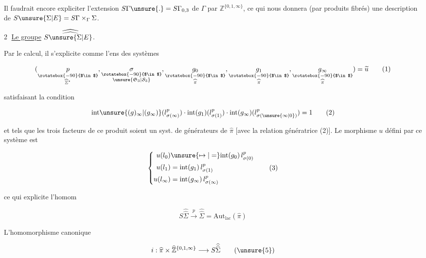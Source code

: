 Il faudrait encore expliciter l'extension $S\Gamma\unsure{.}=S\Gamma_{0,3}$ de $\Gamma$ par $\mathbb Z^{\{0,1,\infty\}}$, ce qui nous donnera (par produits fibrés) une description de $S\unsure{\Sigma|E}=S\Gamma\times_\Gamma\Sigma$.

\textcircled{2} \uline{Le groupe} $S\widehat{\widehat{\unsure{\Sigma|E}}}$.

Par le calcul, il s'explicite comme l'ens des systèmes

\[
(\underset{\substack{\rotatebox{-90}{$\in$}\\\widehat{\mathbb Z}^{*}}}{p},
 \underset{\substack{\rotatebox{-90}{$\in$}\\\unsure{\mathfrak S_3|\mathcal S_3}}}{\sigma},
 \underset{\substack{\rotatebox{-90}{$\in$}\\\widehat\pi}}{g_0},
 \underset{\substack{\rotatebox{-90}{$\in$}\\\widehat\pi}}{g_1},
 \underset{\substack{\rotatebox{-90}{$\in$}\\\widehat\pi}}{g_\infty})=\widetilde u \tag*{(1)}
\]

satisfaisant la condition

\[
\mathrm{int}\unsure{(g)_{\infty}|(g_{\infty})}(l_{\sigma(\infty)}^p)\cdot
\mathrm{int}(g_1)(l_{\sigma(1)}^p)\cdot
\mathrm{int}(g_\infty)(l_{\sigma(\unsure{\infty|0})}^p)=1 \tag*{(2)}
\]

et tels que les trois facteurs de ce produit soient un syst. de générateurs de $\widehat\pi$ [avec la relation génératrice (2)]. Le morphisme $u$ défini par ce  système est

\[
\left\{\begin{aligned}
u(l_0)&\unsure{\mapsto|=}\mathrm{int}(g_0)\,l_{\sigma(0)}^p\\
u(l_1)&=\mathrm{int}(g_1)\,l_{\sigma(1)}^p\\
u(l_\infty)&=\mathrm{int}(g_\infty)\,l_{\sigma(\infty)}^p
\end{aligned}\right. \tag*{(3)}
\]

ce qui explicite l'homom

\[
S\widehat{\widehat\Sigma}\xrightarrow{p}\widehat{\widehat\Sigma}=\mathrm{Aut}_{\mathrm{lac}}(\widehat\pi) \tag*{(4)}
\]

L'homomorphisme canonique

\[
i:\widehat\pi\times\widehat{\mathbb Z}^{\{0,1,\infty\}}\longrightarrow S\widehat{\widehat\Sigma} \tag*{(\unsure{5})}
\]

